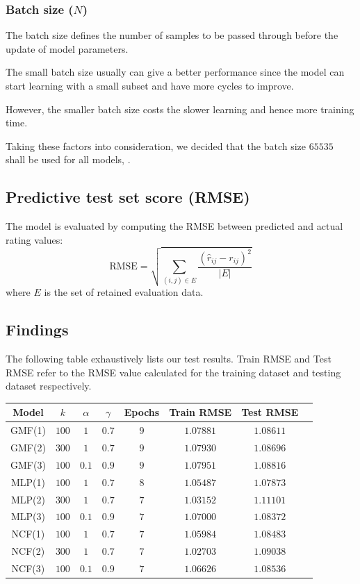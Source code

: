 \documentclass[final]{cvpr}
\begin{document}
\subsubsection{Batch size ($N$)}
The batch size defines the number of samples to be passed through before the update of model parameters.

The small batch size usually can give a better performance since the model can start learning with a small subset and have more cycles to improve.

However, the smaller batch size costs the slower learning and hence more training time.

Taking these factors into consideration, we decided that the batch size $65535$ shall be used for all models, .

\subsection{Predictive test set score (RMSE)}
The model is evaluated by computing the RMSE between predicted and actual rating values:
$$ \text{RMSE} = \sqrt{\sum_{(i, j) \in E} \frac{{(\hat r_{ij} - r_{ij})}^2}{\left| E \right|}} $$
where $E$ is the set of retained evaluation data.


\subsection{Findings}

The following table exhaustively lists our test results. Train RMSE and Test RMSE refer to the RMSE value calculated for the training dataset and testing dataset respectively.

\begin{tabular}{|c|c|c|c|c|c|c|c|}
	\hline
	Model & $k$ & $\alpha$ & $\gamma$ & Epochs & Train RMSE & Test RMSE
	\\ \hline
	GMF(1) & $100$ & $1$ & $0.7$ & $9$ & $1.07881$ & $1.08611$
	\\ \hline
	GMF(2) & $300$ & $1$ & $0.7$ & $9$ & $1.07930$ & $1.08696$
	\\ \hline
	GMF(3) & $100$ & $0.1$ & $0.9$ & $9$ & $1.07951$ & $1.08816$
	\\ \hline
	MLP(1) & $100$ & $1$ & $0.7$ & $8$ & $1.05487$ & $1.07873$
	\\ \hline
	MLP(2) & $300$ & $1$ & $0.7$ & $7$ & $1.03152$ & $1.11101$
	\\ \hline
	MLP(3) & $100$ & $0.1$ & $0.9$ & $7$ & $1.07000$ & $1.08372$
	\\ \hline
	NCF(1) & $100$ & $1$ & $0.7$ & $7$ & $1.05984$ & $1.08483$
	\\ \hline
	NCF(2) & $300$ & $1$ & $0.7$ & $7$ & $1.02703$ & $1.09038$
	\\ \hline
	NCF(3) & $100$ & $0.1$ & $0.9$ & $7$ & $1.06626$ & $1.08536$
	\\ \hline
\end{tabular}
\end{document}
